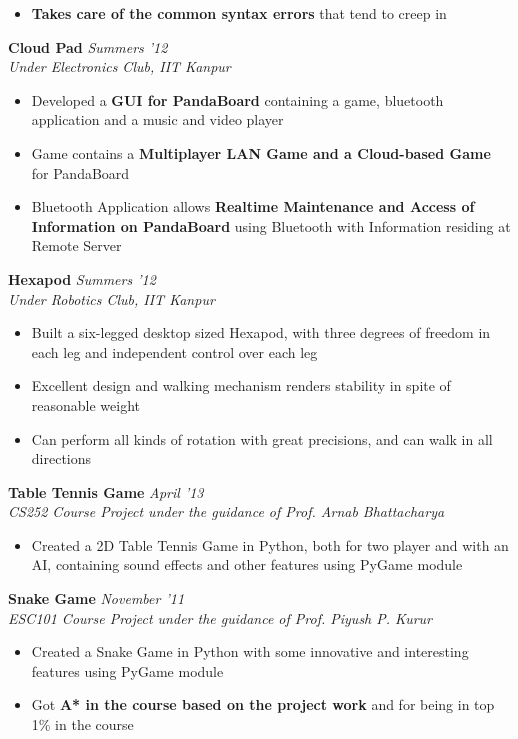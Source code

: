 \documentclass[9pt]{article}
\newenvironment{changemargin}[2]{%
  \begin{list}{}{%
    \setlength{\topsep}{0pt}%
    \setlength{\leftmargin}{#1}%
    \setlength{\rightmargin}{#2}%
    \setlength{\listparindent}{\parindent}%
    \setlength{\itemindent}{\parindent}%
    \setlength{\parsep}{\parskip}%
  }%
  \item[]}{\end{list}
}
\newenvironment{body} {
	\vspace*{-16pt}
	\begin{changemargin}{-0.6in}{-0.65in}
  }	
	{\end{changemargin}
}
\begin{document}
\begin{body}
\begin{itemize}
		\item{\textbf{Takes care of the common syntax errors} that tend to creep in}
	\end{itemize}
	\smallskip
	\textbf{Cloud Pad} \hfill \emph{Summers '12}\\
	\emph{Under Electronics Club, IIT Kanpur}
	\begin{itemize}
		\item{Developed a \textbf{GUI for PandaBoard} containing a game, bluetooth application and a music and video player}
		\item{Game contains a \textbf{Multiplayer LAN Game and a Cloud-based Game} for PandaBoard}
		\item{Bluetooth Application allows \textbf{Realtime Maintenance and Access of Information on PandaBoard} using Bluetooth with Information residing at Remote Server}
	\end{itemize}
	\smallskip
	\textbf{Hexapod} \hfill \emph{Summers '12}\\
	\emph{Under Robotics Club, IIT Kanpur}
	\begin{itemize}
		\item{Built a six-legged desktop sized Hexapod, with three degrees of freedom in each leg and independent control over each leg}
		\item{Excellent design and walking mechanism renders stability in spite of reasonable weight}
		\item{Can perform all kinds of rotation with great precisions, and can walk in all directions}
	\end{itemize}
	\smallskip
	\textbf{Table Tennis Game} \hfill \emph{April '13}\\
	\emph{CS252 Course Project under the guidance of Prof. Arnab Bhattacharya}\\
	\smallskip
	\begin{itemize}
		\item{Created a 2D Table Tennis Game in Python, both for two player and with an AI, containing sound effects and other features using PyGame module}
	\end{itemize}
	\smallskip
	\textbf{Snake Game} \hfill \emph{November '11}\\
	\emph{ESC101 Course Project under the guidance of Prof. Piyush P. Kurur}\\
	\begin{itemize}
		\item{Created a Snake Game in Python with some innovative and interesting features using PyGame module}
		\item{Got \textbf{A* in the course based on the project work} and for being in top 1\% in the course}
	\end{itemize}
\end{body}
\end{document}
